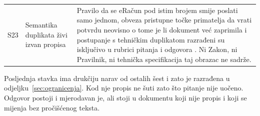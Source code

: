 \begin{longtable}{@{}p{0.9cm}p{5.4cm}p{8.4cm}@{}}
S23 & Semantika duplikata živi izvan propisa &
Pravilo da se eRačun pod istim brojem smije poslati samo jednom, obveza
pristupne točke primatelja da vrati potvrdu neovisno o tome je li dokument već
zaprimila i postupanje s tehničkim duplikatom razrađeni su isključivo u rubrici
pitanja i odgovora \cite{pu2026pitanjaodgovori}. Ni Zakon, ni Pravilnik, ni
tehnička specifikacija taj obrazac ne sadrže. \\

\end{longtable}
\endgroup

Posljednja stavka ima drukčiju narav od ostalih šest i zato je razrađena u
odjeljku~\ref{sec:ogranicenja}. Kod nje propis ne šuti zato što pitanje nije
uočeno. Odgovor postoji i mjerodavan je, ali stoji u dokumentu koji nije propis
i koji se mijenja bez pročišćenog teksta.
